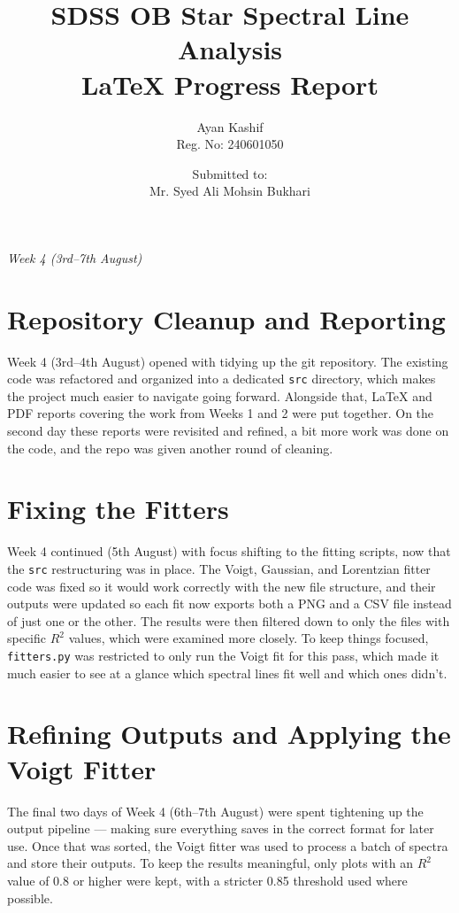 \documentclass[12pt]{article}
\title{\textbf{SDSS OB Star Spectral Line Analysis}\\
\large LaTeX Progress Report}
\author{Ayan Kashif \\ \small Reg. No: 240601050}
\date{Submitted to:\\Mr. Syed Ali Mohsin Bukhari}
\begin{document}
\maketitle
\thispagestyle{empty}

\begin{center}
\textit{ Week 4 (3rd--7th August)}
\end{center}

\clearpage
\tableofcontents
\clearpage


\section{Repository Cleanup and Reporting}
\label{sec:repo-cleanup}

Week 4 (3rd--4th August) opened with tidying up the git repository. The existing code was refactored and organized into a dedicated \texttt{src} directory, which makes the project much easier to navigate going forward. Alongside that, LaTeX and PDF reports covering the work from Weeks 1 and 2 were put together. On the second day these reports were revisited and refined, a bit more work was done on the code, and the repo was given another round of cleaning.

\section{Fixing the Fitters}
\label{sec:fixing-fitters}

Week 4 continued (5th August) with focus shifting to the fitting scripts, now that the \texttt{src} restructuring was in place. The Voigt, Gaussian, and Lorentzian fitter code was fixed so it would work correctly with the new file structure, and their outputs were updated so each fit now exports both a PNG and a CSV file instead of just one or the other. The results were then filtered down to only the files with specific $R^2$ values, which were examined more closely. To keep things focused, \texttt{fitters.py} was restricted to only run the Voigt fit for this pass, which made it much easier to see at a glance which spectral lines fit well and which ones didn't.

\section{Refining Outputs and Applying the Voigt Fitter}
\label{sec:refining-outputs}

The final two days of Week 4 (6th--7th August) were spent tightening up the output pipeline --- making sure everything saves in the correct format for later use. Once that was sorted, the Voigt fitter was used to process a batch of spectra and store their outputs. To keep the results meaningful, only plots with an $R^2$ value of 0.8 or higher were kept, with a stricter 0.85 threshold used where possible.
\end{document}
